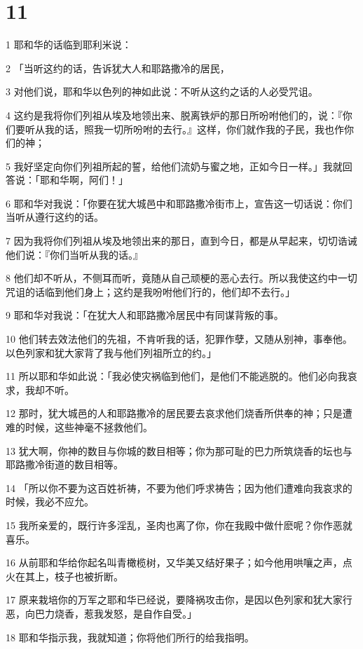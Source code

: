 \chapter{11}

\par 1 耶和华的话临到耶利米说：
\par 2 「当听这约的话，告诉犹大人和耶路撒冷的居民，
\par 3 对他们说，耶和华以色列的神如此说：不听从这约之话的人必受咒诅。
\par 4 这约是我将你们列祖从埃及地领出来、脱离铁炉的那日所吩咐他们的，说：『你们要听从我的话，照我一切所吩咐的去行。』这样，你们就作我的子民，我也作你们的神；
\par 5 我好坚定向你们列祖所起的誓，给他们流奶与蜜之地，正如今日一样。」我就回答说：「耶和华啊，阿们！」
\par 6 耶和华对我说：「你要在犹大城邑中和耶路撒冷街市上，宣告这一切话说：你们当听从遵行这约的话。
\par 7 因为我将你们列祖从埃及地领出来的那日，直到今日，都是从早起来，切切诰诫他们说：『你们当听从我的话。』
\par 8 他们却不听从，不侧耳而听，竟随从自己顽梗的恶心去行。所以我使这约中一切咒诅的话临到他们身上；这约是我吩咐他们行的，他们却不去行。」
\par 9 耶和华对我说：「在犹大人和耶路撒冷居民中有同谋背叛的事。
\par 10 他们转去效法他们的先祖，不肯听我的话，犯罪作孽，又随从别神，事奉他。以色列家和犹大家背了我与他们列祖所立的约。」
\par 11 所以耶和华如此说：「我必使灾祸临到他们，是他们不能逃脱的。他们必向我哀求，我却不听。
\par 12 那时，犹大城邑的人和耶路撒冷的居民要去哀求他们烧香所供奉的神；只是遭难的时候，这些神毫不拯救他们。
\par 13 犹大啊，你神的数目与你城的数目相等；你为那可耻的巴力所筑烧香的坛也与耶路撒冷街道的数目相等。
\par 14 「所以你不要为这百姓祈祷，不要为他们呼求祷告；因为他们遭难向我哀求的时候，我必不应允。
\par 15 我所亲爱的，既行许多淫乱，圣肉也离了你，你在我殿中做什麽呢？你作恶就喜乐。
\par 16 从前耶和华给你起名叫青橄榄树，又华美又结好果子；如今他用哄嚷之声，点火在其上，枝子也被折断。
\par 17 原来栽培你的万军之耶和华已经说，要降祸攻击你，是因以色列家和犹大家行恶，向巴力烧香，惹我发怒，是自作自受。」
\par 18 耶和华指示我，我就知道；你将他们所行的给我指明。
